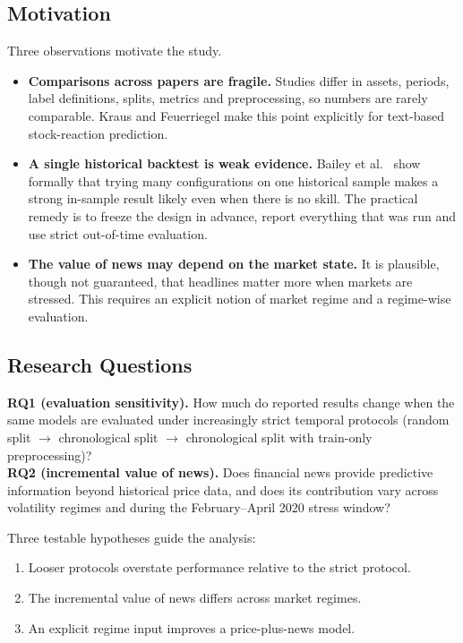 \subsection{Motivation}
Three observations motivate the study.
\begin{itemize}
\item \textbf{Comparisons across papers are fragile.} Studies differ in assets, periods, label definitions, splits, metrics and preprocessing, so numbers are rarely comparable. Kraus and Feuerriegel \cite{kraus2017} make this point explicitly for text-based stock-reaction prediction.
\item \textbf{A single historical backtest is weak evidence.} Bailey et al.\ \cite{bailey2014,bailey2015} show formally that trying many configurations on one historical sample makes a strong in-sample result likely even when there is no skill. The practical remedy is to freeze the design in advance, report everything that was run and use strict out-of-time evaluation.
\item \textbf{The value of news may depend on the market state.} It is plausible, though not guaranteed, that headlines matter more when markets are stressed. This requires an explicit notion of market regime and a regime-wise evaluation.
\end{itemize}

\subsection{Research Questions}
\begin{keybox}
\textbf{RQ1 (evaluation sensitivity).} How much do reported results change when the same models are evaluated under increasingly strict temporal protocols (random split $\rightarrow$ chronological split $\rightarrow$ chronological split with train-only preprocessing)?\\[4pt]
\textbf{RQ2 (incremental value of news).} Does financial news provide predictive information beyond historical price data, and does its contribution vary across volatility regimes and during the February--April 2020 stress window?
\end{keybox}
Three testable hypotheses guide the analysis:
\begin{enumerate}[label=\textbf{H\arabic*:}]
\item Looser protocols overstate performance relative to the strict protocol.
\item The incremental value of news differs across market regimes.
\item An explicit regime input improves a price-plus-news model.
\end{enumerate}

